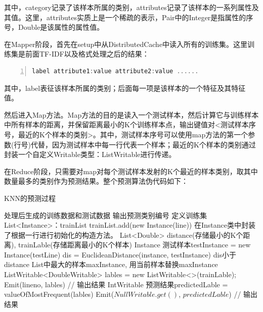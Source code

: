\documentclass[lang=cn,11pt]{elegantpaper}
\begin{document}
其中，category记录了该样本所属的类别，attributes记录了该样本的一系列属性及其值。这里，attributes实质上是一个稀疏的表示，Pair中的Integer是指属性的序号，Double是该属性的属性值。\par
在Mapper阶段，首先在setup中从DistributedCache中读入所有的训练集。这里训练集是前面TF-IDF以及格式处理之后的结果：\par
\begin{lstlisting}[language={Scala},numbers=left,numberstyle=\tiny,%frame=shadowbox,  
  rulesepcolor=\color{red!20!green!20!blue!20},  
  keywordstyle=\color{blue!70!black},  
  commentstyle=\color{blue!90!},  
  basicstyle=\ttfamily]  
  label attribute1:value attribute2:value ......
\end{lstlisting}\par
其中，label表征该样本所属的类别；后面每一项是该样本的一个特征及其特征值。\par
然后进入Map方法。Map方法的目的是读入一个测试样本，然后计算它与训练样本中所有样本的距离，并保留距离最小的K个训练样本点，输出键值对<测试样本序号，最近的K个样本的类别>。其中，测试样本序号可以使用map方法的第一个参数(行号)代替，因为测试样本中每一行代表一个样本；最近的K个样本的类别通过封装一个自定义Writable类型：ListWritable进行传递。\par
在Reduce阶段，只需要对map对每个测试样本发射的K个最近的样本类别，取其中数量最多的类别作为预测结果。整个预测算法伪代码如下：\par
\begin{algorithm}[H]
  \caption{KNN的预测过程}
  \label{alg:Framwork}
  \begin{algorithmic}[1]
    \Require
    处理后生成的训练数据和测试数据
    \Ensure
    输出预测类别编号
    \State 定义训练集List<Instance>：trainList
      \State trainList.add(new Instance(line))
      \Comment 在Instance类中封装了根据一行进行初始化的构造方法。
    \EndFor
  \EndFunction
    \State List<Double> distance(存储最小的K个距离), trainLable(存储距离最小的K个样本)
    \State Instance 测试样本testInstance = new Instance(testLine)
        dis = EuclideanDistance(instance, testInstance)
        \IF dis小于distance List中最大的样本maxInstance,
        	用当前样本替换maxInstance
    \EndFor
    \State ListWritable<DoubleWritable> lables = new ListWritable<>(trainLable);
    \State Emit(lineno, lables) // 输出结果
  \EndFunction
  	IntWritable 预测结果predictedLable = valueOfMostFrequent(lables)
    \State Emit($NullWritable.get()$, $predictedLable$) // 输出结果
  \EndFunction
  \end{algorithmic}
\end{algorithm}
\end{document}
